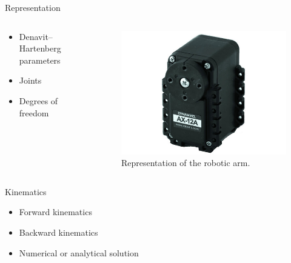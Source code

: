 \documentclass{beamer}
\begin{document}
\begin{frame}{Representation}

    \begin{columns}
        \begin{column}[]{0.5\textwidth}
            \begin{itemize}
                \item Denavit–Hartenberg parameters
                \item Joints
                \item Degrees of freedom
            \end{itemize}
        \end{column}
        
        
        \begin{column}[]{0.5\textwidth}
            \begin{figure}
                \centering
                \includegraphics[width = \textwidth]{img/ax12a.jpg}
                \caption{Representation of the robotic arm.}
            \end{figure}
            
        \end{column}
    \end{columns}
    
\end{frame}




\begin{frame}{Kinematics}

    \begin{itemize}
        \item Forward kinematics
        \item Backward kinematics
        \item Numerical or analytical solution
    \end{itemize}
\end{frame}
\end{document}

